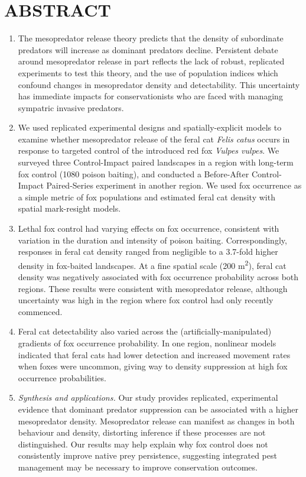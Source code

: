 \documentclass[preprint, 3p, authoryear]{elsarticle} %
\begin{document}
\parskip=12pt

\newpage

\hypertarget{abstract}{%
\section*{ABSTRACT}\label{abstract}}

\begin{enumerate}
\def\labelenumi{\arabic{enumi}.}
\item
  The mesopredator release theory predicts that the density of subordinate predators will increase as dominant predators decline. Persistent debate around mesopredator release in part reflects the lack of robust, replicated experiments to test this theory, and the use of population indices which confound changes in mesopredator density and detectability. This uncertainty has immediate impacts for conservationists who are faced with managing sympatric invasive predators.
\item
  We used replicated experimental designs and spatially-explicit models to examine whether mesopredator release of the feral cat \emph{Felis catus} occurs in response to targeted control of the introduced red fox \emph{Vulpes vulpes}. We surveyed three Control-Impact paired landscapes in a region with long-term fox control (1080 poison baiting), and conducted a Before-After Control-Impact Paired-Series experiment in another region. We used fox occurrence as a simple metric of fox populations and estimated feral cat density with spatial mark-resight models.
\item
  Lethal fox control had varying effects on fox occurrence, consistent with variation in the duration and intensity of poison baiting. Correspondingly, responses in feral cat density ranged from negligible to a 3.7-fold higher density in fox-baited landscapes. At a fine spatial scale (200 m\textsuperscript{2}), feral cat density was negatively associated with fox occurrence probability across both regions. These results were consistent with mesopredator release, although uncertainty was high in the region where fox control had only recently commenced.
\item
  Feral cat detectability also varied across the (artificially-manipulated) gradients of fox occurrence probability. In one region, nonlinear models indicated that feral cats had lower detection and increased movement rates when foxes were uncommon, giving way to density suppression at high fox occurrence probabilities.
\item
  \emph{Synthesis and applications.} Our study provides replicated, experimental evidence that dominant predator suppression can be associated with a higher mesopredator density. Mesopredator release can manifest as changes in both behaviour and density, distorting inference if these processes are not distinguished. Our results may help explain why fox control does not consistently improve native prey persistence, suggesting integrated pest management may be necessary to improve conservation outcomes.
\end{enumerate}
\end{document}
